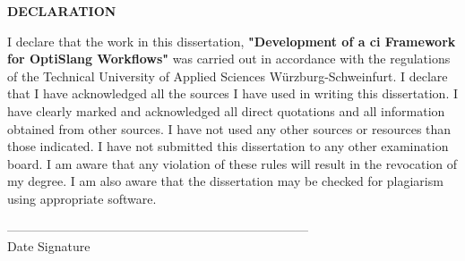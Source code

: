 \vspace*{3cm}
\begin{center}
    \textbf{\Huge DECLARATION}
\end{center}
\vspace{2cm}
\begin{onehalfspace}
    I declare that the work in this dissertation, \textbf{"Development of a \acrlong{ci} Framework for OptiSlang Workflows"} was carried out in accordance
with the regulations of the Technical University of Applied Sciences Würzburg-Schweinfurt. I declare that I have acknowledged all the sources I have used in
writing this dissertation. I have clearly marked and acknowledged all direct quotations and all information obtained from other sources. I have not used any
other sources or resources than those indicated. I have not submitted this dissertation to any other examination board. I am aware that any violation of these
rules will result in the revocation of my degree. I am also aware that the dissertation may be checked for plagiarism using appropriate software.
\end{onehalfspace}

\vspace{1cm}

------------------------------------\hspace{6cm}------------------------------------\\
Date \hspace{12cm} Signature

\vspace*{10cm}


